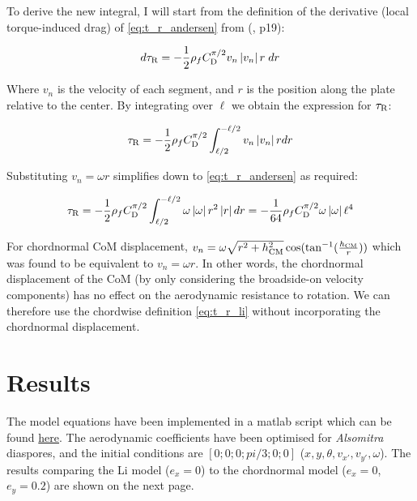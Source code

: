 \documentclass{jfm} %
\begin{document}
To derive the new integral, I will start from the definition of the derivative (local torque-induced drag) of \ref{eq:t_r_andersen} from (\cite{andersen2005analysis}, p19):

\begin{equation}
d \tau_\textnormal{R} = -\frac{1}{2}\rho_f C_{\textup{D}}^{\pi /2} v_n  \left| v_n \right| r\hspace{1mm}dr\label{eq:t_r_andersen_2}
\end{equation}

Where $v_n$ is the velocity of each segment, and $r$ is the position along the plate relative to the center. By integrating over $\ell$ we obtain the expression for $\tau_\textnormal{R}$:

\begin{equation}
\tau_\textnormal{R} = - \frac{1}{2}\rho_f C_{\textup{D}}^{\pi /2} \int_{\ell/2}^{-\ell/2}  v_n  \left| v_n \right| r dr\label{eq:simplified_tr_integral}
\end{equation} 

Substituting $v_n = \omega r$ simplifies down to \ref{eq:t_r_andersen} as required:

\begin{equation}
\tau_\textnormal{R} = -\frac{1}{2}\rho_f C_{\textup{D}}^{\pi /2} \int_{\ell/2}^{-\ell/2} \omega  \left| \omega \right| r^2 \left| r \right|  dr = -\frac{1}{64}\rho_f C_{\textup{D}}^{\pi /2}  \omega  \left| \omega \right|  \ell^4 
\end{equation}

For chordnormal CoM displacement, $v_n = \omega\sqrt{r^2+h_{\textup{CM}}^2}\cos(\tan^{-1}(\frac{h_{\textup{CM}}}{r}))$ which was found to be equivalent to $v_n = \omega r$. In other words, the chordnormal displacement of the CoM (by only considering the broadside-on velocity components) has no effect on the aerodynamic resistance to rotation. We can therefore use the chordwise definition \ref{eq:t_r_li} without incorporating the chordnormal displacement.

\section{Results}
The model equations have been implemented in a matlab script which can be found \href{https://github.com/ckessler2/phd/blob/main/Chornormal_Li_Model/Run_Li_Model.m}{here}. The aerodynamic coefficients have been optimised for \textit{Alsomitra} diaspores, and the initial conditions are $[0; 0; 0; pi/3; 0; 0]$ ($x,y,\theta,v_{x'},v_{y'},\omega$). The results comparing the Li model ($e_x = 0$) to the chordnormal model ($e_x=0$, $e_y = 0.2$) are shown on the next page.
\end{document}
